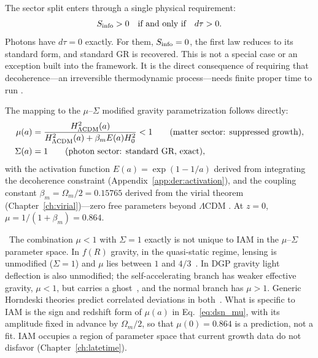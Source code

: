 The sector split enters through a single physical requirement:
\begin{equation}
S_{\rm info}>0\quad\text{if and only if}\quad d\tau>0 . \label{eq:dsn_iff}
\end{equation}
Photons have $d\tau=0$ exactly. For them, $S_{\rm info}=0$, the first law reduces to its standard form, and standard GR is recovered. This is not a
special case or an exception built into the framework. It is the direct consequence of requiring that decoherence---an irreversible thermodynamic
process---needs finite proper time to run \derived.

The mapping to the $\mu$--$\Sigma$ modified gravity parametrization follows directly:
\begin{align}
\mu(a)&=\frac{H^2_{\Lambda\rm CDM}(a)}{H^2_{\Lambda\rm CDM}(a)+\beta_mE(a)H_0^2}<1\qquad\text{(matter sector: suppressed growth)}, \label{eq:dsn_mu}\\
\Sigma(a)&=1\qquad\text{(photon sector: standard GR, exact)}, \label{eq:dsn_sigma}
\end{align}
with the activation function $E(a)=\exp(1-1/a)$ derived from integrating the decoherence constraint (Appendix~\ref{app:der:activation}), and the coupling
constant $\beta_m=\Omega_m/2=0.15765$ derived from the virial theorem (Chapter~\ref{ch:virial})---zero free parameters beyond $\Lambda$CDM \derived. At
$z=0$, $\mu=1/(1+\beta_m)=0.864$.

\observed\ The combination $\mu<1$ with $\Sigma=1$ exactly is not unique to IAM in the $\mu$--$\Sigma$ parameter space. In $f(R)$ gravity, in the
quasi-static regime, lensing is unmodified ($\Sigma=1$) and $\mu$ lies between $1$ and $4/3$~\cite{PogosianSilvestri2008}. In DGP gravity light deflection
is also unmodified; the self-accelerating branch has weaker effective gravity, $\mu<1$, but carries a ghost~\cite{Koyama2007}, and the normal branch has
$\mu>1$. Generic Horndeski theories predict correlated deviations in both~\cite{Amendola2018}. What is specific to IAM is the sign and redshift form of
$\mu(a)$ in Eq.~\eqref{eq:dsn_mu}, with its amplitude fixed in advance by $\Omega_m/2$, so that $\mu(0)=0.864$ is a prediction, not a fit. IAM occupies a
region of parameter space that current growth data do not disfavor (Chapter~\ref{ch:latetime}).

